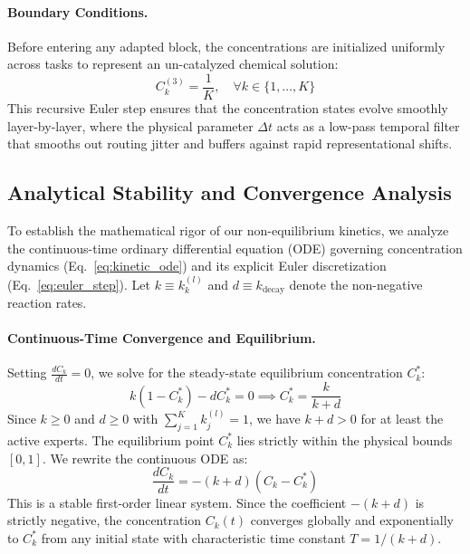 \paragraph{Boundary Conditions.} Before entering any adapted block, the concentrations are initialized uniformly across tasks to represent an un-catalyzed chemical solution:
\begin{equation}
C_{k}^{(3)} = \frac{1}{K}, \quad \forall k \in \{1, \dots, K\}
\end{equation}
This recursive Euler step ensures that the concentration states evolve smoothly layer-by-layer, where the physical parameter $\Delta t$ acts as a low-pass temporal filter that smooths out routing jitter and buffers against rapid representational shifts.

\subsection{Analytical Stability and Convergence Analysis}
To establish the mathematical rigor of our non-equilibrium kinetics, we analyze the continuous-time ordinary differential equation (ODE) governing concentration dynamics (Eq.~\ref{eq:kinetic_ode}) and its explicit Euler discretization (Eq.~\ref{eq:euler_step}). Let $k \equiv k_{k}^{(l)}$ and $d \equiv k_{\text{decay}}$ denote the non-negative reaction rates.

\paragraph{Continuous-Time Convergence and Equilibrium.} Setting $\frac{d C_{k}}{d t} = 0$, we solve for the steady-state equilibrium concentration $C_{k}^*$:
\begin{equation}
k (1 - C_{k}^*) - d C_{k}^* = 0 \implies C_{k}^* = \frac{k}{k + d}
\label{eq:equilibrium}
\end{equation}
Since $k \ge 0$ and $d \ge 0$ with $\sum_{j=1}^K k_{j}^{(l)} = 1$, we have $k + d > 0$ for at least the active experts. The equilibrium point $C_{k}^*$ lies strictly within the physical bounds $[0, 1]$. We rewrite the continuous ODE as:
\begin{equation}
\frac{d C_{k}}{d t} = -(k + d)(C_{k} - C_{k}^*)
\end{equation}
This is a stable first-order linear system. Since the coefficient $-(k + d)$ is strictly negative, the concentration $C_{k}(t)$ converges globally and exponentially to $C_{k}^*$ from any initial state with characteristic time constant $T = 1 / (k + d)$.

